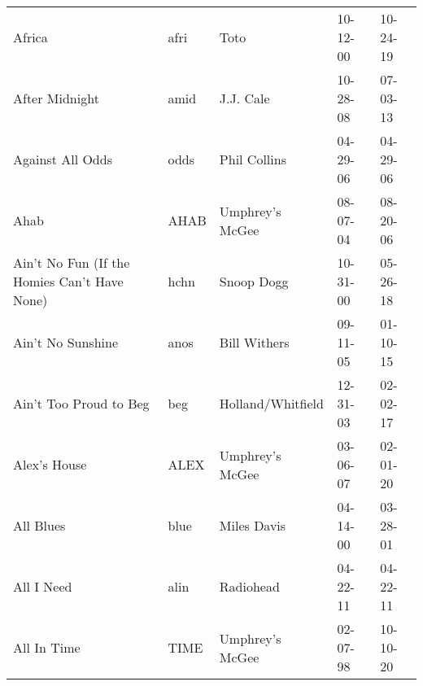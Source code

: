 \begin{longtable}{p{}p{}p{}p{}p{}}
                                                                  Africa &          afri &                                                     Toto &              10-12-00 &             10-24-19 \\
                                                          After Midnight &          amid &                                                J.J. Cale &              10-28-08 &             07-03-13 \\
                                                        Against All Odds &          odds &                                             Phil Collins &              04-29-06 &             04-29-06 \\
                                                                    Ahab &          AHAB &                                          Umphrey's McGee &              08-07-04 &             08-20-06 \\
                            Ain't No Fun (If the Homies Can't Have None) &          hchn &                                               Snoop Dogg &              10-31-00 &             05-26-18 \\
                                                       Ain't No Sunshine &          anos &                                             Bill Withers &              09-11-05 &             01-10-15 \\
                                                  Ain't Too Proud to Beg &           beg &                                        Holland/Whitfield &              12-31-03 &             02-02-17 \\
                                                            Alex's House &          ALEX &                                          Umphrey's McGee &              03-06-07 &             02-01-20 \\
                                                               All Blues &          blue &                                              Miles Davis &              04-14-00 &             03-28-01 \\
                                                              All I Need &          alin &                                                Radiohead &              04-22-11 &             04-22-11 \\
                                                             All In Time &          TIME &                                          Umphrey's McGee &              02-07-98 &             10-10-20 \\

\end{longtable}
